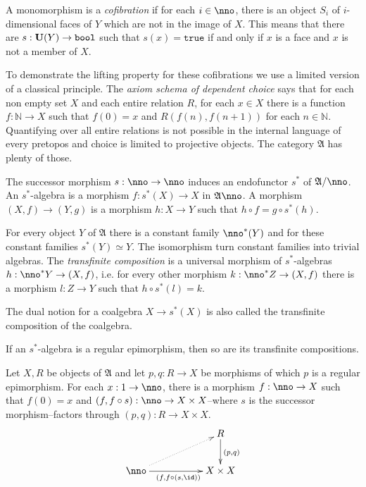 \documentclass{tac}
\newcommand\hide[1]{}
\newcommand\ri{^*}
\newcommand\N{\mathbb N}
\newcommand\of{:}
\newcommand\true{\mathtt{true}}
\newcommand\bool{\mathtt{bool}}
\newcommand\ambient{\mathfrak A}
\begin{document}
\begin{definition} A monomorphism is a \emph{cofibration} if for each $i\in \nno$, there is an object $S_i$ of $i$-dimensional faces of $Y$ which are not in the image of $X$. This means that there are $s:\base Y\to\bool$ such that $s(x)=\true$ if and only if $x$ is a face and $x$ is not a member of $X$.
\end{definition}


\hide{
The principle we need says that certain transfinite compositions of regular epimorphisms are regular epimorphisms. 
To make things more awkward, we are dealing with an internal family of morphisms rather than an external one.

}

\hide{maybe the wrong place. Notice how important it makes projectives. }
To demonstrate the lifting property for these cofibrations we use a limited version of a classical principle.
The \emph{axiom schema of dependent choice} says that for each non empty set $X$ and each entire relation $R$, for each $x\in X$ there is a function $f\of\N\to X$ such that $f(0)=x$ and $R(f(n),f(n+1))$ for each $n\in\N$. 
Quantifying over all entire relations is not possible in the internal language of every pretopos and choice is limited to projective objects. The category $\ambient$ has plenty of those.

\begin{definition} The successor morphism $s\of\nno\to\nno$ induces an endofunctor $s\ri$ of $\ambient/\nno$. An $s\ri$-algebra is a morphism $f\of s\ri(X)\to X$ in $\ambient\nno$. A morphism $(X,f)\to(Y,g)$ is a morphism $h\of X\to Y$ such that $h\circ f = g\circ s\ri(h)$.

For every object $Y$ of $\ambient$ there is a constant family $\nno\ri(Y)$ and for these constant families $s\ri(Y)\simeq Y$. The isomorphism turn constant families into trivial algebras. The \emph{transfinite composition} is a universal morphism of $s\ri$-algebras $h\of \nno\ri Y\to (X,f)$, i.e. for every other morphism $k\of \nno\ri Z\to (X,f)$ there is a morphism $l\of Z\to Y$ such that $h\circ s\ri(l)=k$.

The dual notion for a coalgebra $X\to s\ri(X)$ is also called the transfinite composition of the coalgebra.
\end{definition}\hide{Every isomorphism-algebra is a constant family.}

\begin{proposition}
If an $s\ri$-algebra is a regular epimorphism, then so are its transfinite compositions.%

Let $X,R$ be objects of $\ambient$ and let $p,q\of R\to X$ be morphisms of which $p$ is a regular epimorphism. For each $x\of 1\to \nno$, there is a morphism $f\of\nno\to X$ such that $f(0)=x$ and $(f,f\circ s)\of \nno\to X\times X$--where $s$ is the successor morphism--factors through $(p,q)\of R\to X\times X$.
\[\xymatrix{
&& R\ar[d]^{(p,q)}\\
\nno\ar[rr]_{(f,f\circ(s,\id))} \ar@{.>}[urr] && X\times X
}\]
\end{proposition}
\end{document}
